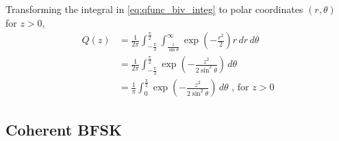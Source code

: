 \documentclass[10pt, a4paper]{article}
\begin{document}
\begin{enumerate}
Transforming the integral in \eqref{eq:qfunc_biv_integ} to polar coordinates $(r,\theta)$ for $z > 0$,
\begin{align}
	Q(z) &= \frac{1}{2\pi}\int_{-\frac{\pi}{2}}^{\frac{\pi}{2}}\int_{\frac{z}{\sin\theta}}^{\infty} \exp\left(-\frac{r^2}{2}\right)r \,dr\,d\theta\\
	&= \frac{1}{2\pi}\int_{-\frac{\pi}{2}}^{\frac{\pi}{2}} \exp\left(-\frac{z^2}{2\sin^2\theta}\right) \,d\theta\\
	&= \frac{1}{\pi}\int_{0}^{\frac{\pi}{2}} \exp\left(-\frac{z^2}{2\sin^2\theta}\right) \,d\theta \text{ , for $z > 0$}
\end{align}
\end{enumerate}



\subsection{Coherent BFSK}
\end{document}
